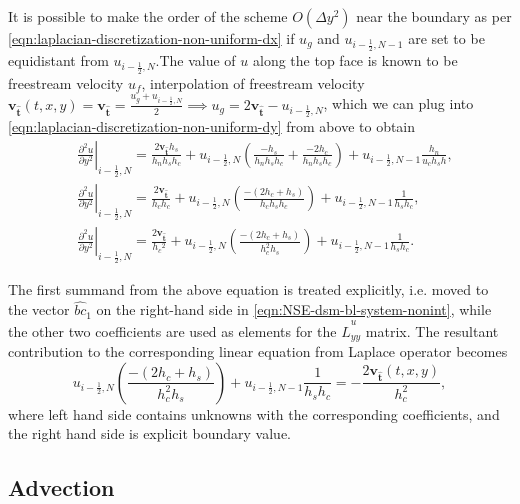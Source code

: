 \documentclass{article}
\numberwithin{equation}{section}
\begin{document}
It is possible to make the order of the scheme $O(\Delta y^2)$ near the boundary as per \cref{eqn:laplacian-discretization-non-uniform-dx} if $u_g$ and $u_{i-\frac{1}{2},N-1}$ are set to be equidistant from $u_{i-\frac{1}{2},N}$.The value of $u$ along the top face is known to be freestream velocity $u_{{f}}$, interpolation of freestream velocity $\boldsymbol{v}_\mathbf{\hat{t}}(t,x,y)=\boldsymbol{v}_\mathbf{\hat{t}} = \frac{u_g+u_{i-\frac{1}{2},N}}{2}\implies u_g=2\boldsymbol{v}_\mathbf{\hat{t}}-u_{i-\frac{1}{2},N}$, which we can plug into \cref{eqn:laplacian-discretization-non-uniform-dy} from above to obtain
\begin{equation}
\begin{aligned}
& \left.\frac{\partial ^2 u}{\partial y^2}\right|_{i-\frac{1}{2},N}=\frac{2 \boldsymbol{v}_\mathbf{\hat{t}} h_s}{h_n h_s h_c}+u_{i-\frac{1}{2},N}\left(\frac{-h_s}{h_n h_s h_c}+\frac{-2 h_c}{h_n h_s h_c}\right)+u_{i-\frac{1}{2},N-1} \frac{h_n}{u_c h_s h},\\
& \left.\frac{\partial^2 u}{\partial y^2}\right|_{i-\frac{1}{2},N}=\frac{2 \boldsymbol{v}_\mathbf{\hat{t}}}{h_c h_c}+u_{i-\frac{1}{2},N}\left(\frac{-\left(2 h_c+h_s\right)}{h_c h_s h_c}\right)+u_{i-\frac{1}{2},N-1} \frac{1}{h_s h_c}, \\
& \left.\frac{\partial^2 u}{\partial y^2}\right|_{i-\frac{1}{2},N}=\frac{2 \boldsymbol{v}_\mathbf{\hat{t}}}{h_c{ }^2}+u_{i-\frac{1}{2},N}\left(\frac{-\left(2 h_c+h_s\right)}{h_c^2 h_s}\right)+u_{i-\frac{1}{2},N-1} \frac{1}{h_s h_c}.
\end{aligned}
\end{equation}

The first summand from the above equation is treated explicitly, i.e. moved to the vector $\hat{bc}_1$ on the right-hand side in \cref{eqn:NSE-dsm-bl-system-nonint}, while the other two coefficients are used as elements for the $\hat{L}^u_{yy}$ matrix. The resultant contribution to the corresponding linear equation from Laplace operator becomes
\begin{equation}
	u_{i-\frac{1}{2},N}\left(\frac{-\left(2 h_c+h_s\right)}{h_c^2 h_s}\right)+u_{i-\frac{1}{2},N-1} \frac{1}{h_s h_c}=-\frac{2 \boldsymbol{v}_\mathbf{\hat{t}}(t,x,y)}{h_c^2},
\end{equation}
where left hand side contains unknowns with the corresponding coefficients, and the right hand side is explicit boundary value.


\subsection{Advection}\label{subsec:advection}
\end{document}
